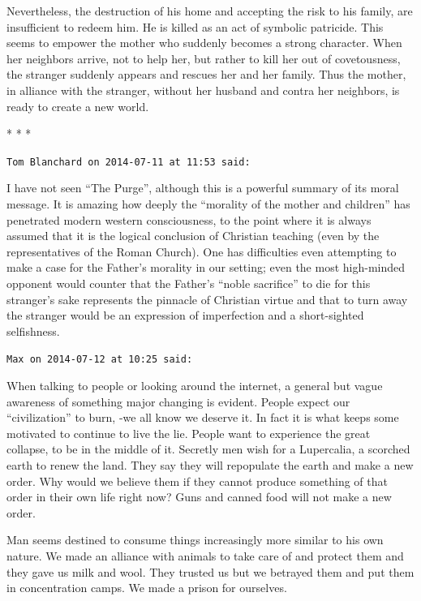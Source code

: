 Nevertheless, the destruction of his home and accepting the risk to his family, are insufficient to redeem him. He is killed as an act of symbolic patricide. This seems to empower the mother who suddenly becomes a strong character. When her neighbors arrive, not to help her, but rather to kill her out of covetousness, the stranger suddenly appears and rescues her and her family. Thus the mother, in alliance with the stranger, without her husband and contra her neighbors, is ready to create a new world.



\begin{center}* * *\end{center}

\begin{footnotesize}
\begin{sffamily}
\texttt{Tom Blanchard on 2014-07-11 at 11:53 said:}

I have not seen ``The Purge'', although this is a powerful summary of its moral message. It is amazing how deeply the ``morality of the mother and children'' has penetrated modern western consciousness, to the point where it is always assumed that it is the logical conclusion of Christian teaching (even by the representatives of the Roman Church). One has difficulties even attempting to make a case for the Father's morality in our setting; even the most high-minded opponent would counter that the Father's ``noble sacrifice'' to die for this stranger's sake represents the pinnacle of Christian virtue and that to turn away the stranger would be an expression of imperfection and a short-sighted selfishness.

\hfill

\texttt{Max on 2014-07-12 at 10:25 said:}

When talking to people or looking around the internet, a general but vague awareness of something major changing is evident. People expect our ``civilization'' to burn, -we all know we deserve it. In fact it is what keeps some motivated to continue to live the lie. People want to experience the great collapse, to be in the middle of it. Secretly men wish for a Lupercalia, a scorched earth to renew the land. They say they will repopulate the earth and make a new order. Why would we believe them if they cannot produce something of that order in their own life right now? Guns and canned food will not make a new order.

Man seems destined to consume things increasingly more similar to his own nature. We made an alliance with animals to take care of and protect them and they gave us milk and wool. They trusted us but we betrayed them and put them in concentration camps. We made a prison for ourselves.


\end{sffamily}
\end{footnotesize}
